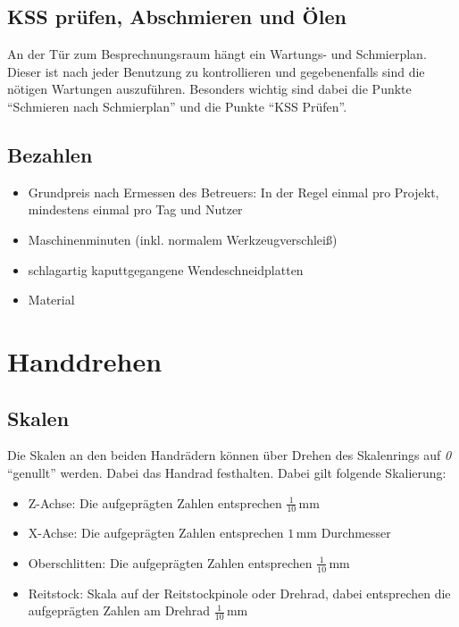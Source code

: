 \documentclass{\basedir/fablab-document}
\begin{document}
\subsection{KSS prüfen, Abschmieren und Ölen}
An der Tür zum Besprechnungsraum hängt ein Wartungs- und Schmierplan. Dieser ist nach jeder Benutzung zu kontrollieren und gegebenenfalls sind die nötigen Wartungen auszuführen. Besonders wichtig sind dabei die Punkte \enquote{Schmieren nach Schmierplan} und die Punkte \enquote{KSS Prüfen}.


\subsection{Bezahlen}
\begin{itemize}
 \item Grundpreis nach Ermessen des Betreuers: In der Regel einmal pro Projekt, mindestens einmal pro Tag und Nutzer
 \item Maschinenminuten (inkl. normalem Werkzeugverschleiß)
 \item schlagartig kaputtgegangene Wendeschneidplatten
 \item Material
\end{itemize}




\newpage
\section{Handdrehen}
\label{handdrehen}
\subsection{Skalen}

Die Skalen an den beiden Handrädern können über Drehen des Skalenrings auf \emph{0} \enquote{genullt} werden.
Dabei das Handrad festhalten.
Dabei gilt folgende Skalierung:
\begin{itemize}
\item Z-Achse: Die aufgeprägten Zahlen entsprechen $\frac{1}{10}$\,mm 
\item X-Achse: Die aufgeprägten Zahlen entsprechen $1$\,mm Durchmesser
\item Oberschlitten: Die aufgeprägten Zahlen entsprechen $\frac{1}{10}$\,mm 
\item Reitstock: Skala auf der Reitstockpinole oder Drehrad, dabei entsprechen die aufgeprägten Zahlen am Drehrad $\frac{1}{10}$\,mm
\end{itemize}
\end{document}
